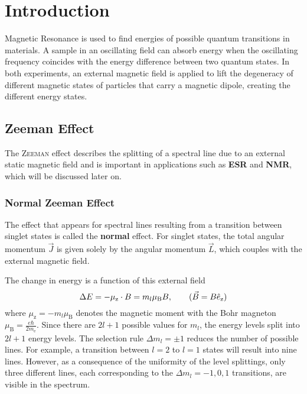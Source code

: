 \chapter{Introduction}
Magnetic Resonance is used to find energies of possible quantum transitions in materials.
A sample in an oscillating field can absorb energy when the oscillating frequency coincides with the energy difference between two quantum states. %
In both experiments, an external magnetic field is applied to lift the degeneracy of different magnetic states of particles that carry a magnetic dipole, creating the different energy states.

\section{Zeeman Effect}\label{sec:zeeman}
The \textsc{Zeeman} effect describes the splitting of a spectral line due to an external static magnetic field and is important in applications such as \textbf{ESR} and \textbf{NMR}, which will be discussed later on.

\subsection{Normal Zeeman Effect}
The effect that appears for spectral lines resulting from a transition between singlet states is called the \textbf{normal} effect.
For singlet states, the total angular momentum $\vec{J}$ is given solely by the angular momentum $\vec{L}$, which couples with the external magnetic field.

The change in energy is a function of this external field
\begin{equation*}
	\Delta E = -\mu_\text{z}\cdot B=m_l\mu_\text{B}B, \tag{$\vec{B}=B\hat{e}_\text{z}$}
\end{equation*}
where $\mu_\text{z}=-m_l\mu_\text{B}$ denotes the magnetic moment with the Bohr magneton $\mu_\text{B}=\frac{e\hbar}{2m_\text{e}}$.
Since there are $2l+1$ possible values for $m_l$, the energy levels split into $2l+1$ energy levels.
The selection rule $\Delta m_l=\pm 1$ reduces the number of possible lines.
For example, a transition between $l=2$ to $l=1$ states will result into nine lines.
However, as a consequence of the uniformity of the level splittings, only three different lines, each corresponding to the $\Delta m_l=-1,0,1$ transitions, are visible in the spectrum.

